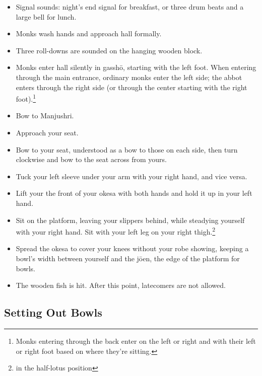 \documentclass{article}
\begin{document}
\begin{multicols}{2}
\begin{itemize}
\item Signal sounds: night's end signal for breakfast, or three drum beats
and a large bell for lunch.
\item Monks wash hands and approach hall formally.
\item Three roll-downs are sounded on the hanging wooden block.
\item Monks enter hall silently in gassh\=o, starting with the left foot.
  When entering through the main entrance,
  ordinary monks enter the left side; the abbot enters
  through the right side (or through the center starting with the right
  foot).\footnote{Monks entering through the back enter on the left or right
    and with their left or right foot based on where they're sitting.}
\item Bow to Manjushri.
\item Approach your seat.
\item Bow to your seat, understood as a bow to those on each side, then
  turn clockwise and bow to the seat across from yours.
\item Tuck your left sleeve under your arm with your right hand, and vice versa.
\item Lift your the front of your okesa with both hands and hold it up in
  your left hand.
\item Sit on the platform, leaving your
  slippers behind, while steadying yourself with your right hand.
  Sit with your left leg on your right thigh.\footnote{in the half-lotus
    position}
\item Spread the okesa to cover your knees without your robe showing,
  keeping a bowl's width between yourself and the j\=oen, the
  edge of the platform for bowls.
\item The wooden fish is hit. After this point, latecomers are not allowed.
\end{itemize}

\subsection{Setting Out Bowls}


\end{multicols}
\end{document}
